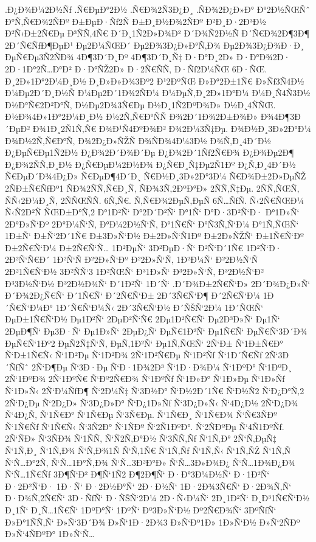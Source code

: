 {.Ð¿Ð¾Ð¼2Ð½Ñƒ
.Ñ€ÐµÐ°2Ð½
.Ñ€Ð¾2Ñ3Ð¿Ð¸
.ÑÐ¾2Ð¿Ð»Ð°
Ð°2Ð½ÑŒÑˆ
Ð°Ñ‚Ñ€Ð¾2ÑÐº
Ð±ÐµÐ·Ñƒ2Ñ
Ð±Ð¸Ð½Ð¾2ÑÐº
Ð²Ð¸Ð·2Ð³Ð½
Ð²Ñ‹Ð±2Ñ€Ðµ
Ð³ÑÑ‚4Ñ€
Ð´Ð¸1Ñ2Ð»Ð¾Ð²
Ð´Ð¾Ñ2Ð½Ñ
Ð´Ñ€Ð¾2Ð¶3Ð¶
2Ð´Ñ€ÑƒÐ¶ÐµÐ¹
Ðµ2Ð¼ÑŒÐ´
Ðµ2Ð¾3Ð¿Ð»Ð°Ñ‚Ð¾
Ðµ2Ð¾3Ð¿Ð¾Ð·Ð¸
ÐµÑ€Ðµ3Ñ2ÑÐ¾
4Ð¶3Ð´Ð¸Ðº
4Ð¶3Ð´Ð¸Ñ‡
Ð·Ð°Ð¸2Ð»
Ð·Ð°Ð¾2Ð·
2Ð·1Ð°2Ñ…Ð°Ð²
Ð·Ð°ÑŽ2Ð»
Ð·2Ñ€ÑÑ‚
Ð·Ñƒ2Ð¼ÑŒ
6Ð·ÑŒ.
Ð¸2Ð»1Ð°2Ð¼Ð¸Ð½
Ð¸Ð»Ð»Ð¾3Ðº2
Ð¹2ÐºÑŒ
Ð»Ð°2Ð±1Ñ€
Ð»Ñƒ3Ñ4Ð½
Ð¼Ðµ2Ð´Ð¸Ð½Ñ
Ð¼Ðµ2Ð´1Ð¾2ÑÐ¼
Ð¼ÐµÑ‚Ð¸2Ð»1Ð°Ð¼
Ð¼Ð¸Ñ4Ñ3Ð½
Ð½Ð°Ñ€2Ð²Ð°Ñ‚
Ð½Ðµ2Ð¾3Ñ€Ðµ
Ð½Ð¸1Ñ2ÐºÐ¾Ð»
Ð½Ð¸4ÑÑŒ.
Ð½Ð¾4Ð»1Ð°2Ð¼Ð¸Ð½
Ð½2Ñ‚Ñ€Ð°ÑÑ
Ð¾2Ð´1Ð¾2Ð±Ð¾Ð»
Ð¾4Ð¶3Ð´ÐµÐ²
Ð¾1Ð¸2Ñ1Ñ‚Ñ€
Ð¾Ð¹Ñ4ÐºÐ¾Ð²
Ð¾2Ð¼3Ñ‡Ðµ.
Ð¾Ð½Ð¸3Ð»2Ð°Ð¼
Ð¾Ð½2Ñ‚Ñ€Ð°Ñ‚
Ð¾2Ð¿Ð»ÑŽÑ
Ð¾ÑÐ¾4Ð¼3Ð½
Ð¾Ñ‚Ð¸4Ð´Ð½
Ð¿ÐµÑ€Ðµ1Ñ2Ð½
Ð¿Ð¾2Ð´Ð¾Ð´Ðµ
Ð¿Ð¾2Ð´1Ñƒ2Ñ€Ð¾
Ð¿Ð¾Ðµ2Ð¶
Ð¿Ð¾2ÑÑ‚Ð¸Ð½
Ð¿Ñ€ÐµÐ¼2Ð½Ð¾
Ð¿Ñ€Ð¸Ñ‡Ðµ2Ñ1Ðº
Ð¿Ñ‚Ð¸4Ð´Ð½
Ñ€ÐµÐ´Ð¾4Ð¿Ð»
Ñ€ÐµÐ¶4Ð´Ð¸
Ñ€Ð½Ð¸3Ð»2Ð°3Ð¼
Ñ€Ð¾Ð±2Ð»ÐµÑŽ
2ÑÐ±Ñ€ÑƒÐº1
ÑÐ¾2ÑÑ‚Ñ€Ð¸Ñ‚
ÑÐ¾3Ñ‚2ÐºÐ°Ð»
2ÑÑ‚Ñ‡Ðµ.
2ÑÑ‚ÑŒÑ‚
ÑÑ‹2Ð¼Ð¸Ñ‚
2ÑÑŒÑÑ.
6Ñ‚Ñ€.
Ñ‚Ñ€Ð¾2ÐµÑ‚ÐµÑ
6Ñ…ÑƒÑ.
Ñ‹2Ñ€ÑŒÐ¼
Ñ‹Ñ2Ð²Ñ
ÑŒÐ±Ð°Ñ‚2
Ð°1Ð²Ñ‘
Ð°2Ð´Ð²Ñ‘
Ð°1Ñ‘
Ð°Ð·3Ð²Ñ‘Ð·
Ð°1Ð»Ñ‘
2Ð°Ð»Ñ‘Ðº
2Ð°Ð¼Ñ‘Ñ‚
Ð°Ð¼2Ð½Ñ‘Ñ‚
Ð°1Ñ€Ñ‘
Ð°Ñ3Ñ‚Ñ‘Ð¼
Ð°1Ñ‚ÑŒÑ‘
1Ð±Ñ‘
Ð±Ñ‘2Ð´1Ñ€
Ð±3Ð»Ñ‘Ð½
Ð±2Ð»Ñ‘Ñ1Ðº
Ð±2Ð»ÑŽÑ‘
Ð±1Ñ€Ñ‘Ðº
Ð±2Ñ€Ñ‘Ð¼
Ð±2Ñ€Ñ‘Ñ…
1Ð²ÐµÑ‘
3Ð²ÐµÐ·Ñ‘
Ð²Ñ‘Ð´1Ñ€
1Ð²Ñ‘Ð·
2Ð²Ñ‘Ñ€Ð´
1Ð²Ñ‘Ñ
Ð²2Ð»Ñ‘Ðº
Ð²2Ð»Ñ‘Ñ‚
1Ð²Ð¼Ñ‘
Ð²2Ð½Ñ‘Ñ
2Ð²1Ñ€Ñ‘Ð½
3Ð²ÑÑ‘3
1Ð²ÑŒÑ‘
Ð³1Ð»Ñ‘
Ð³2Ð»Ñ‘Ñ‚
Ð³2Ð½Ñ‘Ð²
Ð³3Ð½Ñ‘Ð½
Ð³2Ð½Ð¾Ñ‘
Ð´1Ð²Ñ‘
1Ð´Ñ‘
.Ð´Ð¾Ð±2Ñ€Ñ‘Ð»
2Ð´Ð¾Ð¿Ð»Ñ‘
Ð´Ð¾2Ð¿Ñ€Ñ‘
Ð´1Ñ€Ñ‘
Ð´2Ñ€Ñ‘Ð±
2Ð´3Ñ€Ñ‘Ð¶
Ð´2Ñ€Ñ‘Ð¼
1Ð´Ñ€Ñ‘Ð¼Ð°
1Ð´Ñ€Ñ‘Ð¼Ñ‹
2Ð´3Ñ€Ñ‘Ð½
Ð´ÑŠÑ‘2Ð¼
1Ð´ÑŒÑ‘
ÐµÐ±1Ñ€Ñ‘Ð½
Ðµ1Ð²Ñ‘
2ÐµÐ²Ñ‘Ñ€
2Ðµ1Ð²Ñ€Ñ‘
Ðµ2Ð³Ð»Ñ‘
Ðµ1Ñ‘
2ÐµÐ¶Ñ‘
Ðµ3Ð·Ñ‘
Ðµ1Ð»Ñ‘
2ÐµÐ¿Ñ‘
ÐµÑ€1Ð²Ñ‘
Ðµ1Ñ€Ñ‘
ÐµÑ€Ñ‘3Ð´Ð¾
ÐµÑ€Ñ‘1Ðº2
ÐµÑ2Ñ‡Ñ‘Ñ‚
ÐµÑ‚1Ð²Ñ‘
Ðµ1Ñ‚ÑŒÑ‘
2Ñ‘Ð±
Ñ‘1Ð±Ñ€Ð°
Ñ‘Ð±1Ñ€Ñ‹
Ñ‘1Ð²Ðµ
Ñ‘1Ð²Ð¾
2Ñ‘1Ð²Ñ€Ðµ
Ñ‘1Ð²Ñƒ
Ñ‘1Ð´Ñ€Ñƒ
2Ñ‘3Ð´ÑƒÑˆ
2Ñ‘Ð¶Ðµ
Ñ‘3Ð·Ðµ
Ñ‘Ð·1Ð¾2Ð³
Ñ‘1Ð·Ð¾Ð¼
Ñ‘1ÐºÐ°
Ñ‘1ÐºÐ¸
2Ñ‘1ÐºÐ¾
2Ñ‘1ÐºÑ€
Ñ‘Ðº2Ñ€Ð¾
Ñ‘1ÐºÑƒ
Ñ‘1Ð»Ð°
Ñ‘1Ð»Ðµ
Ñ‘1Ð»Ñƒ
Ñ‘1Ð»Ñ‹
2Ñ‘Ð¼ÑƒÐ¶
Ñ‘2Ð¼Ñ‡
Ñ‘3Ð½Ð°
Ñ‘Ð½2Ð´1Ñ€
Ñ‘Ð½Ñ2
Ñ‘Ð¿Ð°Ñ‚2
2Ñ‘Ð¿Ðµ
Ñ‘2Ð¿Ð»
Ñ‘3Ð¿Ð»Ð°
Ñ‘Ð¿1Ð»Ñƒ
Ñ‘3Ð¿Ð»Ñ‹
Ñ‘4Ð¿Ð½
2Ñ‘Ð¿Ð¾
Ñ‘4Ð¿Ñ‚
Ñ‘1Ñ€Ð°
Ñ‘1Ñ€Ðµ
Ñ‘3Ñ€Ðµ.
Ñ‘1Ñ€Ð¸
Ñ‘1Ñ€Ð¾
Ñ‘Ñ€3ÑÐº
Ñ‘1Ñ€Ñƒ
Ñ‘1Ñ€Ñ‹
Ñ‘3Ñ2Ð°
Ñ‘1ÑÐº
Ñ‘2Ñ1ÐºÐ°.
Ñ‘2ÑÐºÐµ
Ñ‘4Ñ1ÐºÑƒ.
2Ñ‘ÑÐ»
Ñ‘3ÑÐ¾
Ñ‘1ÑÑ‚
Ñ‘Ñ2Ñ‚Ð°Ð½
Ñ‘3ÑÑ‚Ñƒ
Ñ‘1Ñ‚Ð°
2Ñ‘Ñ‚ÐµÑ‡
Ñ‘1Ñ‚Ð¸
Ñ‘1Ñ‚Ð¾
Ñ‘Ñ‚Ð¾1Ñ
Ñ‘Ñ‚1Ñ€
Ñ‘1Ñ‚Ñƒ
Ñ‘1Ñ‚Ñ‹
Ñ‘1Ñ‚ÑŽ
Ñ‘1Ñ‚Ñ
Ñ‘Ñ…Ð°2Ñ‚
Ñ‘Ñ…1Ð°Ñ‚Ð¾
Ñ‘Ñ…3Ð²Ð°Ð»
Ñ‘Ñ…3Ð»Ð¾Ð¿
Ñ‘Ñ…1Ð¾Ð¿Ð¾
Ñ‘Ñ…1Ñ€Ñƒ
3Ð¶Ñ‘Ð²
Ð¶Ñ‘1Ñ2
Ð¶2Ð¶Ñ‘
Ð·Ð°3Ð¼Ð½Ñ‘
Ð·1Ð²Ñ‘
Ð·2Ð²Ñ‘Ð·
1Ð·Ñ‘
Ð·2Ð½Ð°Ñ‘
2Ð·Ð½Ñ‘
1Ð·2Ð¾3Ñ€Ñ‘
Ð·2Ð¾Ñ‚Ñ‘
Ð·Ð¾Ñ‚2Ñ€Ñ‘
3Ð·ÑƒÑ‘
Ð·ÑŠÑ‘2Ð¼
2Ð·Ñ‹Ð¼Ñ‘
2Ð¸1Ð²Ñ‘
Ð¸Ð³1Ñ€Ñ‘Ð½
Ð¸1Ñ‘
Ð¸Ñ…1Ñ€Ñ‘
1ÐºÐ°Ñ‘
1ÐºÑ‘
Ðº3Ð»Ñ‘Ð½
Ðº2Ñ€Ð¾Ñ‘
3ÐºÑƒÑ‘
Ð»Ð°1ÑÑ‚Ñ‘
Ð»Ñ‘3Ð´Ð¾
Ð»Ñ‘1Ð·2Ð¾3
Ð»Ñ‘Ðº1Ð»
1Ð»Ñ‘Ð½
Ð»Ñ‘2ÑÐº
Ð»Ñ‘4ÑÐºÐ°
1Ð»Ñ‘Ñ…
}

